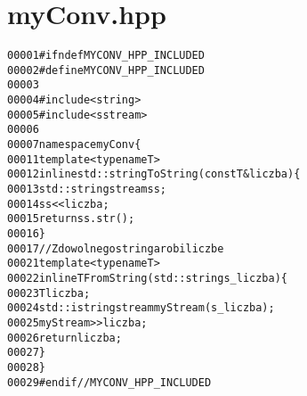 \hypertarget{myConv_8hpp_source}{
\section{myConv.hpp}
}


\begin{footnotesize}\begin{alltt}
00001 \textcolor{preprocessor}{#ifndef MYCONV\_HPP\_INCLUDED}
00002 \textcolor{preprocessor}{}\textcolor{preprocessor}{#define MYCONV\_HPP\_INCLUDED}
00003 \textcolor{preprocessor}{}
00004 \textcolor{preprocessor}{#include <string>}
00005 \textcolor{preprocessor}{#include <sstream>}
00006 
00007 \textcolor{keyword}{namespace }myConv\{
00011     \textcolor{keyword}{template} <\textcolor{keyword}{typename} T>
00012     \textcolor{keyword}{inline} std::string ToString(\textcolor{keyword}{const} T& liczba)\{
00013         std::stringstream ss;
00014         ss << liczba;
00015         \textcolor{keywordflow}{return} ss.str();
00016     \}
00017     \textcolor{comment}{//Z dowolnego stringa robi liczbe}
00021 \textcolor{comment}{}    \textcolor{keyword}{template} <\textcolor{keyword}{typename} T>
00022     \textcolor{keyword}{inline} T FromString(std::string s\_liczba)\{
00023         T liczba;
00024         std::istringstream myStream(s\_liczba);
00025         myStream>>liczba;
00026         \textcolor{keywordflow}{return} liczba;
00027     \}
00028 \}
00029 \textcolor{preprocessor}{#endif // MYCONV\_HPP\_INCLUDED}
\end{alltt}\end{footnotesize}
